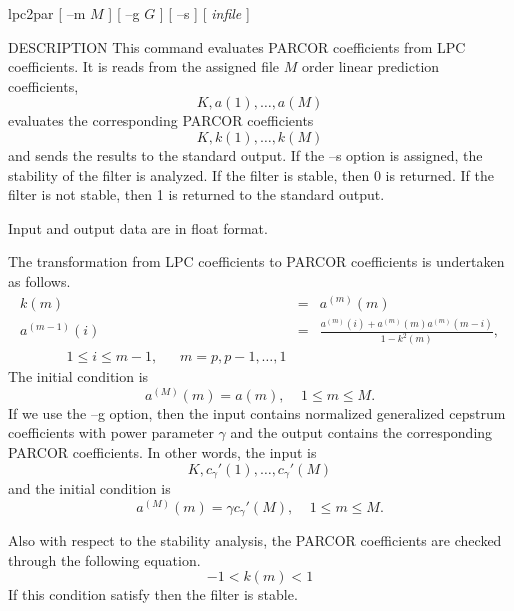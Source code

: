 
\begin{synopsis}
\item [lpc2par] [ --m $M$ ] [ --g $G$ ] [ --s ] [ {\em infile} ] 
\end{synopsis}

\begin{qsection}{DESCRIPTION}
This command evaluates PARCOR coefficients from LPC coefficients.
It is reads from the assigned file $M$ order linear prediction
coefficients,
\begin{displaymath}
  K, a(1),\ldots, a(M)
\end{displaymath}
evaluates the corresponding PARCOR coefficients
\begin{displaymath}
  K, k(1),\ldots, k(M)
\end{displaymath}
and sends the results to the standard output.
If the --s option is assigned, the stability of the filter is analyzed.
If the filter is stable, then 0 is returned.
If the filter is not stable, then 1 is returned to the standard output.
\par
Input and output data are in float format.
\par
The transformation from LPC coefficients to PARCOR coefficients
is undertaken as follows.
\begin{eqnarray*} 
k(m) &=& a^{(m)}(m) \\
a^{(m-1)}(i) &=& \frac{a^{(m)}(i)+a^{(m)}(m)a^{(m)}(m-i)}{1-k^2(m)},\\
~~~~~~~~~~~~~~~1 \leq i \leq m-1,~~~~~~~m=p, p-1, \ldots, 1
\end{eqnarray*}
The initial condition is
\begin{displaymath}
a^{(M)}(m) = a(m), ~~~~~1 \leq m \leq M.
\end{displaymath}
If we use the --g option, then the input contains normalized generalized
cepstrum coefficients with power parameter $\gamma$
and the output contains the corresponding PARCOR coefficients.
In other words, the input is 
\begin{displaymath}
K,c_\gamma'(1),\ldots,c_\gamma'(M)
\end{displaymath}
and the initial condition is
\begin{displaymath}
a^{(M)}(m) = \gamma c_\gamma'(M), ~~~~~1 \leq m \leq M.
\end{displaymath}

Also with respect to the stability analysis,
the PARCOR coefficients are checked through the following equation.
\begin{displaymath}
-1 < k(m) < 1
\end{displaymath}
If this condition satisfy then the filter is stable.

\end{qsection}

